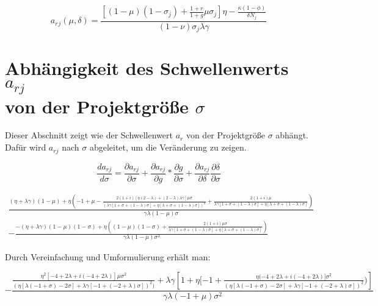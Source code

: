 \begin{equation} 
a_r{_j}(\mu,\delta)=\frac{[(1-\mu)(1-\sigma_j)+\frac{1+r}{1+g}\mu\sigma_j]\eta-\frac{\kappa(1-\phi)}{\delta N_j}}{(1-\nu)\sigma_j\lambda\gamma}
\end{equation}


\section[Abhängigkeit des Schwellenwerts $a_{rj}$ von der Projektgrö{\ss}e $\sigma$]{Abhängigkeit des Schwellenwerts $a_{rj}$\\ von der Projektgrö{\ss}e $\sigma$ }\label{SchwellenwertAr}


Dieser Abschnitt zeigt wie der Schwellenwert $a_r$ von der Projektgrö{\ss}e $\sigma$ abhängt. Dafür wird $a_{rj}$ nach $\sigma$ abgeleitet, um die Veränderung zu zeigen.


\begin{equation}
\frac{da_{rj}}{d \sigma}= \frac{\partial a_{rj}}{\partial \sigma}+ \frac{\partial a_{rj}}{\partial g}*\frac{\partial g}{\partial \sigma} + \frac{\partial a_{rj}}{\partial \delta}\frac{\partial \delta}{\partial \sigma}
\end{equation}


\begin{equation}
\begin{split}
\frac{(\eta + \lambda \gamma) (1-\mu)+ \eta\left(-1+ \mu - \frac{2(1+ i)[\eta(2- \lambda)+(2- \lambda) \lambda \gamma] \mu  \sigma}{(\lambda \gamma[1+ \sigma + ( 1 - \lambda) \sigma] +\eta [\lambda + \sigma + (1- \lambda)\sigma])^{2}} + \frac{2(1+i)\mu}{\lambda \gamma [1+ \sigma + (1- \lambda)\sigma]+ \eta[\lambda+ \sigma +(1- \lambda) \sigma]}\right)} {\gamma \lambda(1- \mu) \sigma}\\
- \frac{-(\eta + \lambda \gamma)(1 -  \mu)(1- \sigma)+ \eta\left((1- \mu)(1- \sigma)+ \frac{2(1+i) \mu \sigma}{\lambda \gamma [1+ \sigma + (1- \lambda) \sigma ]+\eta[ \lambda + \sigma + (1- \lambda) \sigma]}\right) } {\gamma \lambda (1- \mu) \sigma^{2}}
\end{split}
\end{equation}


Durch Vereinfachung und Umformulierung erhält man:


\begin{equation}
- \frac{\frac{\eta^{2}[-4 +2\lambda + i(-4 + 2\lambda)]\mu\sigma^{2}}{\left(\eta[\lambda(-1 + \sigma)- 2\sigma]+\lambda\gamma[-1+(-2+\lambda)\sigma]\right)^{2})} + \lambda \gamma \left[1 + \eta [-1 + \frac{\eta (-4+2\lambda + i (-4+2 \lambda)] \sigma^{2}} {(\eta [ \lambda (-1+ \sigma)- 2\sigma]+ \lambda \gamma [-1+ (-2+ \lambda) \sigma])^{2}})\right] }{\gamma \lambda (-1 + \mu) \sigma^{2}}
\end{equation}



